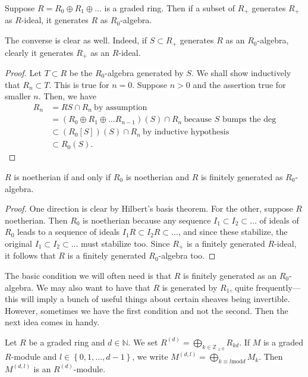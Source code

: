 \begin{proposition} 
Suppose $R = R_0 \oplus R_1 \oplus \dots$ is  a graded ring. Then if a subset
of $R_+$ generates $R_+$ as $R$-ideal, it generates $R$ as $R_0$-algebra.
\end{proposition} 
The converse is clear as well. 
Indeed, if $S \subset R_+$ generates $R$ as an $R_0$-algebra, clearly it
generates $R_+$ as an $R$-ideal. 
\begin{proof} 
Let $T \subset R$ be the $R_0$-algebra generated by $S$. We shall show
inductively that $R_n \subset T$. This is true for $n=0$. Suppose $n>0$ and the
assertion true for smaller $n$. Then, we have
\begin{align*}
R_n  & = RS \cap R_n   \ \text{by assumption} \\
& = (R_0 \oplus R_1 \oplus \dots R_{n-1})(S) \cap R_n \ \text{because $S$ bumps
the deg} \\
& \subset (R_0[S]) (S) \cap R_n \ \text{by inductive hypothesis} \\
& \subset R_0(S). \end{align*}
\end{proof} 
\begin{theorem} 
$R$ is noetherian if and only if $R_0$ is noetherian and $R$ is finitely
generated as $R_0$-algebra.
\end{theorem} 
\begin{proof} 
One direction is clear by Hilbert's basis theorem. For the other, suppose $R$
noetherian. Then $R_0$ is noetherian because any sequence $I_1 \subset I_2
\subset \dots$ of ideals of $R_0$ leads to a sequence of ideals $I_1 R \subset
I_2 R \subset \dots$, and since these stabilize, the original $I_1 \subset I_2
\subset \dots$ must stabilize too.  Since $R_+$ is a finitely generated
$R$-ideal, it follows that $R$ is a finitely generated $R_0$-algebra too.
\end{proof} 

The basic condition we will often need is that $R$ is finitely generated as an
$R_0$-algebra. We may also want to have that $R$ is generated by $R_1$, quite
frequently---this will imply a bunch of useful things about certain sheaves
being invertible. 
However, sometimes we have the first condition and not the second. Then the
next idea comes in handy.

\begin{definition} 
Let $R$ be a graded ring and $d \in \mathbb{N}$. We set $R^{(d)} = \bigoplus_{k
\in \mathbb{Z}_{\geq 0}} R_{kd}$.  If $M$ is a graded $R$-module and $l \in
\left\{0, 1, \dots, d-1\right\}$, we write $M^{(d,l)} = \bigoplus_{k \equiv l
\mathrm{mod} d} M_k$. Then $M^{(d,l)}$ is an $R^{(d)}$-module. 
\end{definition} 

